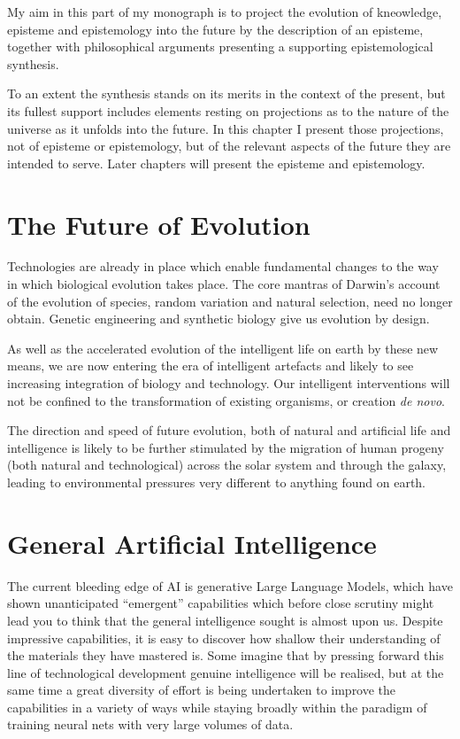 \documentclass[10pt,titlepage]{book}
\begin{document}
My aim in this part of my monograph is to project the evolution of kneowledge, episteme and epistemology into the future by the description of an episteme, together with philosophical arguments presenting a supporting epistemological synthesis.

To an extent the synthesis stands on its merits in the context of the present, but its fullest support includes elements resting on projections as to the nature of the universe as it unfolds into the future.
In this chapter I present those projections, not of episteme or epistemology, but of the relevant aspects of the future they are intended to serve.
Later chapters will present the episteme and epistemology.

\section{The Future of Evolution}

Technologies are already in place which enable fundamental changes to the way in which biological evolution takes place.
The core mantras of Darwin's account of the evolution of species, random variation and natural selection, need no longer obtain.
Genetic engineering and synthetic biology give us evolution by design.

As well as the accelerated evolution of the intelligent life on earth by these new means, we are now entering the era of intelligent artefacts and likely to see increasing integration of biology and technology.
Our intelligent interventions will not be confined to the transformation of existing organisms, or creation \emph{de novo}.

The direction and speed of future evolution, both of natural and artificial life and intelligence is likely to be further stimulated by the migration of human progeny (both natural and technological) across the solar system and through the galaxy, leading to environmental pressures very different to anything found on earth.

\section{General Artificial Intelligence}

The current bleeding edge of AI is generative Large Language Models, which have shown unanticipated ``emergent'' capabilities which before close scrutiny might lead you to think that the general intelligence sought is almost upon us.
Despite impressive capabilities, it is easy to discover how shallow their understanding of the materials they have mastered is.
Some imagine that by pressing forward this line of technological development genuine intelligence will be realised, but at the same time a great diversity of effort is being undertaken to improve the capabilities in a variety of ways while staying broadly within the paradigm of training neural nets with very large volumes of data.
\end{document}
